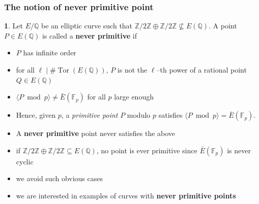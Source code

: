 \documentclass[12pt,handout]{beamer} %
\newcommand{\Q}{\mathbb Q}
\newcommand{\Z}{\mathbb Z}
\newcommand{\F}{\mathbb F}
\theoremstyle{definition}
\newtheorem{Defi}[theorem]{\translate{Definition}}
\begin{document}
\begin{frame}
 \frametitle{The notion of never primitive point}
 
 \begin{Defi} Let $E/\Q$ be an elliptic curve such that  $\Z/2\Z\oplus\Z/2\Z\nsubseteq E(\Q)$. A point $P\in E(\Q)$ is called a 
\textbf{never primitive} if
\begin{itemize}
 \item $P$ has infinite order 
 \item for all $\ell\mid\#\operatorname{Tor}(E(\Q))$, $P$ is not the $\ell$--th power of a rational point $Q\in E(\Q)$
 \item $\langle P\bmod p\rangle \neq \bar{E}(\F_p)$ for all $p$ large enough
\end{itemize}
\end{Defi}\pause

\begin{itemize}[<+-|alert@+>]
 \item Hence, given $p$, a \emph{primitive point} $P$ modulo $p$ satisfies
$\langle P\bmod p\rangle = \bar{E}(\F_p).$
\item A \textbf{never primitive} point never satisfies the above
\item if $\Z/2\Z\oplus\Z/2\Z\subseteq E(\Q)$, no point is ever primitive since $\bar{E}(\F_p)$ is never cyclic
\item[] we avoid such obvious cases
\item we are interested in examples of curves with \textbf{never primitive points}
\end{itemize}


\end{frame}
\end{document}
